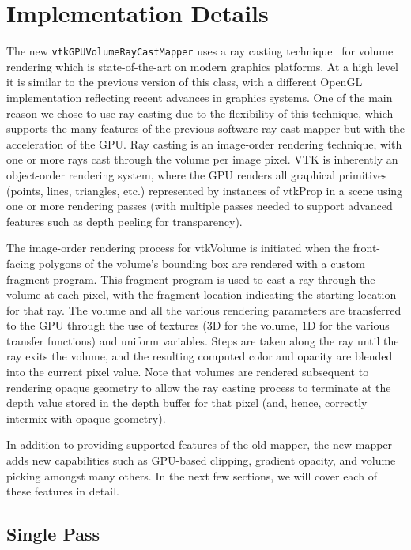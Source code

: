 \section{Implementation Details}
\label{implementationdetails}
The new \texttt{vtkGPUVolumeRayCastMapper} uses a ray casting
technique~\citep{engel_real-time_2006} for volume rendering which
is state-of-the-art on modern graphics platforms. At a
high level it is similar to the previous version of this
class, with a different OpenGL implementation reflecting recent advances in
graphics systems. One of the main reason we chose to use ray casting due to the flexibility of
this technique, which supports the many features of the previous software ray
cast mapper but with the acceleration of the GPU. Ray casting is an image-order
rendering technique, with one or more rays cast through the volume per image
pixel. VTK is inherently an object-order rendering system, where the GPU renders
all graphical primitives (points, lines, triangles, etc.) represented by instances of
vtkProp in a scene using one or more rendering passes (with multiple passes needed to
support advanced features such as depth peeling for transparency).

The image-order rendering process for vtkVolume is initiated when the
front-facing polygons of the volume’s bounding box are rendered with a custom
fragment program. This fragment program is used to cast a ray through the volume
at each pixel, with the fragment location indicating the starting location for
that ray. The volume and all the various rendering parameters are transferred to
the GPU through the use of textures (3D for the volume, 1D for the various
transfer functions) and uniform variables. Steps are taken along the ray until
the ray exits the volume, and the resulting computed color and opacity are
blended into the current pixel value. Note that volumes are rendered subsequent to
rendering opaque geometry to allow the ray casting process to terminate at
the depth value stored in the depth buffer for that pixel (and, hence, correctly
intermix with opaque geometry).

In addition to providing supported features of the old mapper, the new mapper
adds new capabilities such as GPU-based clipping,  gradient opacity, and volume
picking amongst many others. In the next few sections, we will cover each of
these features in detail.

\subsection{Single Pass}



